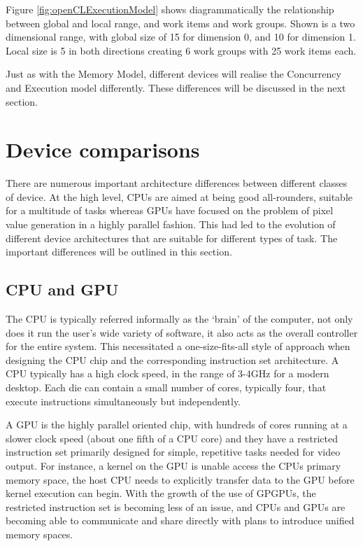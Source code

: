 Figure \ref{fig:openCLExecutionModel} shows diagrammatically the relationship
between global and local range, and work items and work groups. Shown is a two
dimensional range, with global size of 15 for dimension 0, and 10 for dimension
1. Local size is 5 in both directions creating 6 work groups with 25 work items
each.

Just as with the Memory Model, different devices will realise the Concurrency
and Execution model differently. These differences will be discussed in the next
section.

\section{Device comparisons}

There are numerous important architecture differences between different classes
of device. At the high level, CPUs are aimed at being good all-rounders,
suitable for a multitude of tasks whereas GPUs have focused on the problem of
pixel value generation in a highly parallel fashion. This had led to the
evolution of different device architectures that are suitable for different
types of task. The important differences will be outlined in this section.

\subsection{CPU and GPU}

The CPU is typically referred informally as the `brain' of the computer, not
only does it run the user's wide variety of software, it also acts as the
overall controller for the entire system. This necessitated a one-size-fits-all
style of approach when designing the CPU chip and the corresponding instruction
set architecture. A CPU typically has a high clock speed, in the range of 3-4GHz
for a modern desktop. Each die can contain a small number of cores, typically
four, that execute instructions simultaneously but independently.

A GPU is the highly parallel oriented chip, with hundreds of cores running at a
slower clock speed (about one fifth of a CPU core) and they have a restricted
instruction set primarily designed for simple, repetitive tasks needed for video
output. For instance, a kernel on the GPU is unable access the CPUs primary
memory space, the host CPU needs to explicitly transfer data to the GPU before
kernel execution can begin. With the growth of the use of GPGPUs, the restricted
instruction set is becoming less of an issue, and CPUs and GPUs are becoming
able to communicate and share directly with plans to introduce unified memory
spaces.

